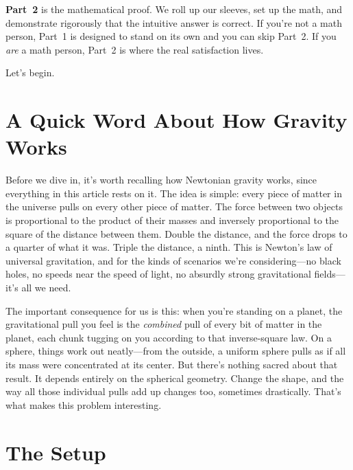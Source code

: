 \documentclass[11pt, letterpaper]{article}
\begin{document}
\textbf{Part~2} is the mathematical proof. We roll up our sleeves, set up the math, and demonstrate rigorously that the intuitive answer is correct. If you're not a math person, Part~1 is designed to stand on its own and you can skip Part~2. If you \textit{are} a math person, Part~2 is where the real satisfaction lives.

Let's begin.

\newpage


\section*{A Quick Word About How Gravity Works}

Before we dive in, it's worth recalling how Newtonian gravity works, since everything in this article rests on it. The idea is simple: every piece of matter in the universe pulls on every other piece of matter. The force between two objects is proportional to the product of their masses and inversely proportional to the square of the distance between them. Double the distance, and the force drops to a quarter of what it was. Triple the distance, a ninth. This is Newton's law of universal gravitation, and for the kinds of scenarios we're considering---no black holes, no speeds near the speed of light, no absurdly strong gravitational fields---it's all we need.

The important consequence for us is this: when you're standing on a planet, the gravitational pull you feel is the \textit{combined} pull of every bit of matter in the planet, each chunk tugging on you according to that inverse-square law. On a sphere, things work out neatly---from the outside, a uniform sphere pulls as if all its mass were concentrated at its center. But there's nothing sacred about that result. It depends entirely on the spherical geometry. Change the shape, and the way all those individual pulls add up changes too, sometimes drastically. That's what makes this problem interesting.


\section*{The Setup}
\end{document}

